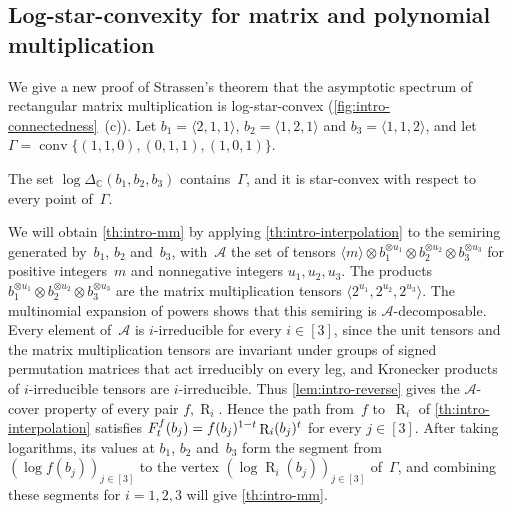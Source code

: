 \documentclass[11pt,letterpaper]{article}
\DeclareMathOperator{\tensorrank}{R}
\newcommand{\CC}{\mathbb{C}}
\DeclareMathOperator{\conv}{conv}
\begin{document}
\subsection{Log-star-convexity for matrix and polynomial multiplication}

We give a new proof of Strassen's theorem that the asymptotic spectrum of rectangular matrix multiplication is log-star-convex (\cref{fig:intro-connectedness}~(c)). Let \(b_1=\langle2,1,1\rangle\), \(b_2=\langle1,2,1\rangle\) and \(b_3=\langle1,1,2\rangle\), and let \(\Gamma=\conv\{(1,1,0),(0,1,1),(1,0,1)\}\).

\begin{theorem}\label{th:intro-mm}
The set \(\log\Delta_\CC(b_1,b_2,b_3)\) contains~\(\Gamma\), and it is star-convex with respect to every point of~\(\Gamma\).
\end{theorem}

We will obtain \cref{th:intro-mm} by applying \cref{th:intro-interpolation} to the semiring generated by~\(b_1\), \(b_2\) and~\(b_3\), with~\(\mathcal{A}\) the set of tensors \(\langle m\rangle\otimes b_1^{\otimes u_1}\otimes b_2^{\otimes u_2}\otimes b_3^{\otimes u_3}\) for positive integers~\(m\) and nonnegative integers \(u_1,u_2,u_3\). The products \(b_1^{\otimes u_1}\otimes b_2^{\otimes u_2}\otimes b_3^{\otimes u_3}\) are the matrix multiplication tensors \(\langle2^{u_1},2^{u_2},2^{u_3}\rangle\). The multinomial expansion of powers shows that this semiring is \(\mathcal{A}\)-decomposable. Every element of~\(\mathcal{A}\) is \(i\)-irreducible for every \(i\in[3]\), since the unit tensors and the matrix multiplication tensors are invariant under groups of signed permutation matrices that act irreducibly on every leg, and Kronecker products of \(i\)-irreducible tensors are \(i\)-irreducible. Thus \cref{lem:intro-reverse} gives the \(\mathcal{A}\)-cover property of every pair \(f,\tensorrank_i\). Hence the path from~\(f\) to~\(\tensorrank_i\) of \cref{th:intro-interpolation} satisfies \(F^{\smash[t]{f}}_t(b_j)=f(b_j)^{1-t}\tensorrank_i(b_j)^t\) for every \(j\in[3]\). After taking logarithms, its values at \(b_1\), \(b_2\) and~\(b_3\) form the segment from \((\log f(b_j))_{j\in[3]}\) to the vertex \((\log\tensorrank_i(b_j))_{j\in[3]}\) of~\(\Gamma\), and combining these segments for \(i=1,2,3\) will give \cref{th:intro-mm}.
\end{document}
